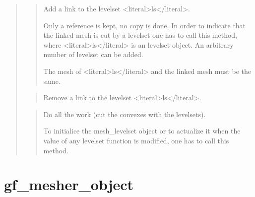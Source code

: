 \documentclass[a4paper,11pt,english]{sphinxmanual}
\begin{document}
\sphinxAtStartPar
{}
\begin{quote}

\sphinxAtStartPar
{}
\begin{quote}

\sphinxAtStartPar
Add a link to the levelset \textless{}literal\textgreater{}ls\textless{}/literal\textgreater{}.

\sphinxAtStartPar
Only a reference is kept, no copy is done. In order to indicate
that the linked mesh is cut by a levelset one has to call this
method, where \textless{}literal\textgreater{}ls\textless{}/literal\textgreater{} is an levelset object. An arbitrary number of
levelset can be added.

\sphinxAtStartPar
{}

\sphinxAtStartPar
The mesh of \textless{}literal\textgreater{}ls\textless{}/literal\textgreater{} and the linked mesh must be the same.
\end{quote}

\sphinxAtStartPar
{}
\begin{quote}

\sphinxAtStartPar
Remove a link to the levelset \textless{}literal\textgreater{}ls\textless{}/literal\textgreater{}.
\end{quote}

\sphinxAtStartPar
{}
\begin{quote}

\sphinxAtStartPar
Do all the work (cut the convexes with the levelsets).

\sphinxAtStartPar
To initialice the mesh\_levelset object or to actualize it when the
value of any levelset function is modified, one has to call
this method.
\end{quote}
\end{quote}


\section{gf\_mesher\_object}
\label{\detokenize{scilab/cmdref_gf_mesher_object:gf-mesher-object}}\label{\detokenize{scilab/cmdref_gf_mesher_object::doc}}
\sphinxAtStartPar
{}
\end{document}
